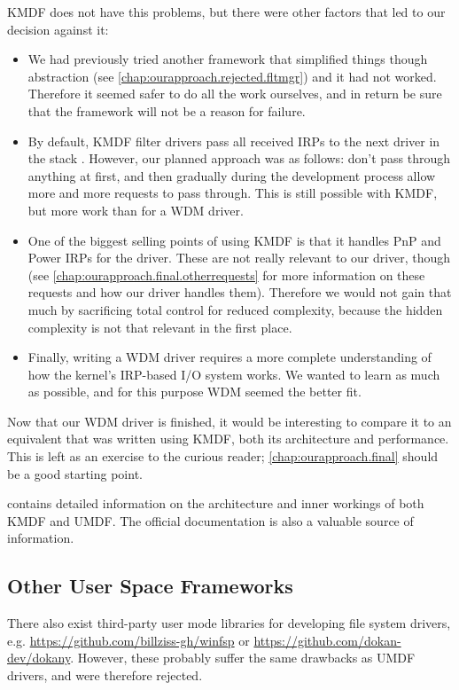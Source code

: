 KMDF does not have this problems, but there were other factors that led to our decision against it:
\begin{itemize}
	\item We had previously tried another framework that simplified things though abstraction (see \autoref{chap:ourapproach.rejected.fltmgr}) and it had not worked. Therefore it seemed safer to do all the work ourselves, and in return be sure that the framework will not be a reason for failure.
	\item By default, KMDF filter drivers pass all received IRPs to the next driver in the stack \cite{Wdf}. However, our planned approach was as follows: don't pass through anything at first, and then gradually during the development process allow more and more requests to pass through. This is still possible with KMDF, but more work than for a WDM driver.
	\item One of the biggest selling points of using KMDF is that it handles PnP and Power IRPs for the driver. These are not really relevant to our driver, though (see \autoref{chap:ourapproach.final.otherrequests} for more information on these requests and how our driver handles them). Therefore we would not gain that much by sacrificing total control for reduced complexity, because the hidden complexity is not that relevant in the first place.
	\item Finally, writing a WDM driver requires a more complete understanding of how the kernel's IRP-based I/O system works. We wanted to learn as much as possible, and for this purpose WDM seemed the better fit.
\end{itemize}

Now that our WDM driver is finished, it would be interesting to compare it to an equivalent that was written using KMDF, both its architecture and performance. This is left as an exercise to the curious reader; \autoref{chap:ourapproach.final} should be a good starting point.

\cite{Yosifovich2017} contains detailed information on the architecture and inner workings of both KMDF and UMDF. The official documentation \cite{Wdf} is also a valuable source of information.

\subsection{Other User Space Frameworks}
\label{chap:ourapproach.rejected.other}
There also exist third-party user mode libraries for developing file system drivers, e.g. \url{https://github.com/billziss-gh/winfsp} or \url{https://github.com/dokan-dev/dokany}. However, these probably suffer the same drawbacks as UMDF drivers, and were therefore rejected.

